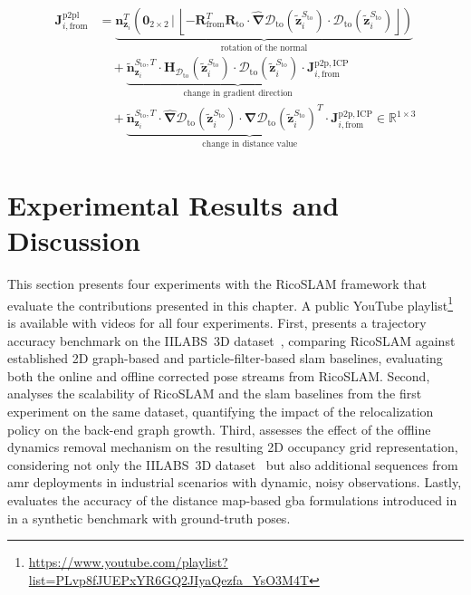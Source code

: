 \begin{equation}
\begin{aligned}
\label{eq:slam:gba:p2pl:jacobian:from}
\mathbf{J}_{i,\mathrm{from}}^{\mathrm{p2pl}} & =
\underbrace{
  \mathbf{n}_{\mathbf{z}_i}^{T}
  \left(\mathbf{0}_{2\times 2}\,\Big|\,
    \left\lfloor -\mathbf{R}_{\mathrm{from}}^T \mathbf{R}_{\mathrm{to}} \cdot
                  \hat{\bm{\nabla}}\mathcal{D}_{\mathrm{to}}\!\left(\tilde{\mathbf{z}}_i^{S_{\mathrm{to}}}\right) \cdot
                  \mathcal{D}_{\mathrm{to}}\!\left(\tilde{\mathbf{z}}_i^{S_{\mathrm{to}}}\right)
    \right\rfloor
  \right)
}_{\text{rotation of the normal}}
\\
&\quad+
\underbrace{
  \tilde{\mathbf{n}}_{\mathbf{z}_i}^{S_{\mathrm{to}},T} \cdot
  \mathbf{H}_{\mathcal{D}_{\mathrm{to}}}\!\left(\tilde{\mathbf{z}}_i^{S_{\mathrm{to}}}\right) \cdot
  \mathcal{D}_{\mathrm{to}}\!\left(\tilde{\mathbf{z}}_i^{S_{\mathrm{to}}}\right) \cdot
  \mathbf{J}_{i,\mathrm{from}}^{\mathrm{p2p,ICP}}
}_{\text{change in gradient direction}}
\\
&\quad+
\underbrace{
  \tilde{\mathbf{n}}_{\mathbf{z}_i}^{S_{\mathrm{to}},T} \cdot
  \hat{\bm{\nabla}}\mathcal{D}_{\mathrm{to}}\!\left(\tilde{\mathbf{z}}_i^{S_{\mathrm{to}}}\right) \cdot
  \bm{\nabla}\mathcal{D}_{\mathrm{to}}\!\left(\tilde{\mathbf{z}}_i^{S_{\mathrm{to}}}\right)^T \cdot
  \mathbf{J}_{i,\mathrm{from}}^{\mathrm{p2p,ICP}}
}_{\text{change in distance value}}
\in\mathbb{R}^{1\times3}
\end{aligned}
\end{equation}

\section{Experimental Results and Discussion}\label{sec:slam:results}

This section presents four experiments with the RicoSLAM framework that evaluate
the contributions presented in this chapter.
A public YouTube playlist\footnote{\url{https://www.youtube.com/playlist?list=PLvp8fJUEPxYR6GQ2JIyaQezfa_YsO3M4T}}
is available with videos for all four experiments.
First,  presents a trajectory accuracy
benchmark on the IILABS~3D dataset~\cite{ribeiro:access:2025}, comparing
RicoSLAM against established 2D graph-based and particle-filter-based \gls{slam}
baselines, evaluating both the online and offline corrected pose streams from
RicoSLAM.
Second,  analyses the scalability of
RicoSLAM and the \gls{slam} baselines from the first experiment on the same
dataset, quantifying the impact of the relocalization policy on
the back-end graph growth.
Third,  assesses the effect of
the offline dynamics removal mechanism on the resulting 2D occupancy grid
representation, considering not only the IILABS~3D
dataset~\cite{ribeiro:access:2025} but also additional sequences from \gls{amr}
deployments in industrial scenarios with dynamic, noisy observations.
Lastly,  evaluates the accuracy of the distance
map-based \gls{gba} formulations introduced in 
in a synthetic benchmark with ground-truth poses.

